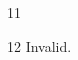 \documentclass[paper=A4]{ropas-poster}
\begin{document}
\begin{postergrid}{1}{1}
\begin{posterblock}{1}{2}
Invalid.
\end{posterblock}
\end{postergrid}
\end{document}
